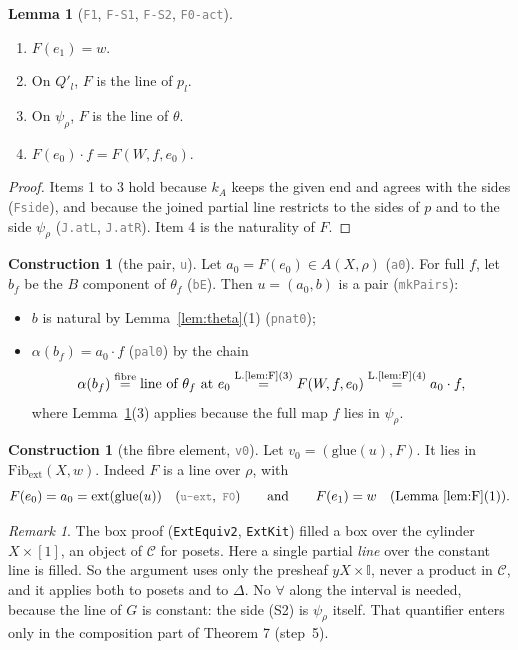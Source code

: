 \documentclass[11pt]{article}
\newcommand{\seg}[1]{\textcolor{gray}{\texttt{\small #1}}}
\newcommand{\I}{\mathbb{I}}
\newcommand{\ext}{\mathrm{ext}}
\newcommand{\glue}{\mathrm{glue}}
\newcommand{\Fib}{\mathrm{Fib}}
\theoremstyle{definition}
\newtheorem{lemma}[definition]{Lemma}
\newtheorem{construction}[definition]{Construction}
\theoremstyle{remark}
\newtheorem*{remark}{Remark}
\begin{document}
\begin{lemma}[\seg{F1}, \seg{F-S1}, \seg{F-S2}, \seg{F0-act}]\label{lem:F}
\leavevmode
\begin{enumerate}
\item $F(e_1)=w$.
\item On $Q'_l$, $F$ is the line of $p_l$.
\item On $\psi_\rho$, $F$ is the line of $\theta$.
\item $F(e_0)\cdot f=F(W,f,e_0)$.
\end{enumerate}
\end{lemma}

\begin{proof}
Items 1 to 3 hold because $k_A$ keeps the given end and agrees with the
sides (\seg{Fside}), and because the joined partial line restricts to the
sides of $p$ and to the side $\psi_\rho$ (\seg{J.atL}, \seg{J.atR}). Item 4 is the naturality of
$F$.
\end{proof}

\begin{construction}[the pair, \seg{u}]
Let $a_0=F(e_0)\in A(X,\rho)$ (\seg{a0}). For full $f$, let $b_f$ be the
$B$ component of $\theta_f$ (\seg{bE}). Then $u=(a_0,b)$ is a pair
(\seg{mkPairs}):
\begin{itemize}
\item $b$ is natural by Lemma~\ref{lem:theta}(1) (\seg{pnat0});
\item $\alpha(b_f)=a_0\cdot f$ (\seg{pal0}) by the chain
\[
\alpha(b_f)\overset{\text{fibre}}{=}\text{line of }\theta_f\text{ at }e_0
\overset{\text{L.\ref{lem:F}(3)}}{=}F(W,f,e_0)
\overset{\text{L.\ref{lem:F}(4)}}{=}a_0\cdot f,
\]
where Lemma~\ref{lem:F}(3) applies because the full map $f$ lies in
$\psi_\rho$.
\end{itemize}
\end{construction}

\begin{construction}[the fibre element, \seg{v0}]
Let $v_0=(\glue(u),F)$. It lies in $\Fib_{\ext}(X,w)$. Indeed $F$ is a line
over $\rho$, with
\[
F(e_0)=a_0=\ext(\glue(u))\quad(\seg{u-ext},\ \seg{F0})
\qquad\text{and}\qquad
F(e_1)=w\quad(\text{Lemma~\ref{lem:F}(1)}).
\]
\end{construction}

\begin{remark}
The box proof (\texttt{ExtEquiv2}, \texttt{ExtKit}) filled a box over the
cylinder $X\times[1]$, an object of $\mathcal C$ for posets. Here a single partial \emph{line} over the constant
line is filled. So the argument uses only the presheaf $yX\times\I$, never a product in
$\mathcal C$, and it applies
both to posets and to $\Delta$. No $\forall$ along the interval is needed,
because the line of $G$ is constant: the side (S2) is $\psi_\rho$
itself. That quantifier enters only in the
composition part of Theorem 7 (step~5).
\end{remark}
\end{document}
